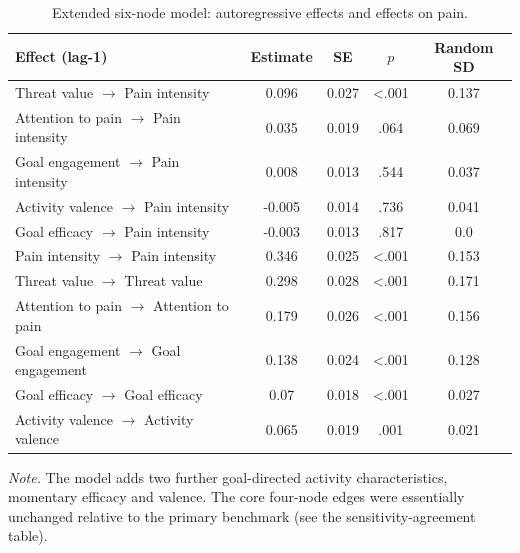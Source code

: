 \begin{table}[!htbp]
\raggedright
\caption{Extended six-node model: autoregressive effects and effects on pain.}
\label{tab:sup-extended}
\scriptsize
\begingroup
\setlength{\tabcolsep}{4pt}
\renewcommand{\arraystretch}{1.08}
\noindent
\begin{tabular*}{\textwidth}{@{\extracolsep{\fill}}lcccc@{}}
\toprule
Effect (lag-1) & Estimate & SE & $p$ & Random SD \\
\midrule
Threat value $\rightarrow$ Pain intensity & 0.096 & 0.027 & <.001 & 0.137 \\
Attention to pain $\rightarrow$ Pain intensity & 0.035 & 0.019 & .064 & 0.069 \\
Goal engagement $\rightarrow$ Pain intensity & 0.008 & 0.013 & .544 & 0.037 \\
Activity valence $\rightarrow$ Pain intensity & -0.005 & 0.014 & .736 & 0.041 \\
Goal efficacy $\rightarrow$ Pain intensity & -0.003 & 0.013 & .817 & 0.0 \\
Pain intensity $\rightarrow$ Pain intensity & 0.346 & 0.025 & <.001 & 0.153 \\
Threat value $\rightarrow$ Threat value & 0.298 & 0.028 & <.001 & 0.171 \\
Attention to pain $\rightarrow$ Attention to pain & 0.179 & 0.026 & <.001 & 0.156 \\
Goal engagement $\rightarrow$ Goal engagement & 0.138 & 0.024 & <.001 & 0.128 \\
Goal efficacy $\rightarrow$ Goal efficacy & 0.07 & 0.018 & <.001 & 0.027 \\
Activity valence $\rightarrow$ Activity valence & 0.065 & 0.019 & .001 & 0.021 \\
\bottomrule
\end{tabular*}
\par\vspace{3pt}\noindent\parbox{\textwidth}{\scriptsize\textit{Note.} The model adds two further goal-directed activity characteristics, momentary efficacy and valence. The core four-node edges were essentially unchanged relative to the primary benchmark (see the sensitivity-agreement table).}
\endgroup
\end{table}
